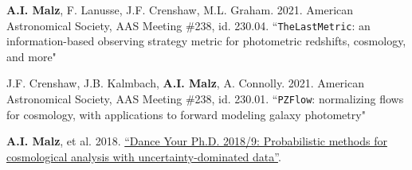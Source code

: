 \nopagebreak\begin{list}{}{\malzlist}
	
	\item {\bf A.I. Malz}, F. Lanusse, J.F. Crenshaw, M.L. Graham. 2021. American Astronomical Society, AAS Meeting \#238, id. 230.04. ``\texttt{TheLastMetric}: an information-based observing strategy metric for photometric redshifts, cosmology, and more"
	
	\item J.F. Crenshaw, J.B. Kalmbach, {\bf A.I. Malz}, A. Connolly. 2021. American Astronomical Society, AAS Meeting \#238, id. 230.01. ``\texttt{PZFlow}: normalizing flows for cosmology, with applications to forward modeling galaxy photometry"
	
	
	
	
	\item {\bf A.I. Malz}, et al. 2018. \href{https://youtu.be/vKs3PYqZWg8}{``Dance Your Ph.D. 2018/9: Probabilistic methods for cosmological analysis with uncertainty-dominated data''}.
	

\end{list}
